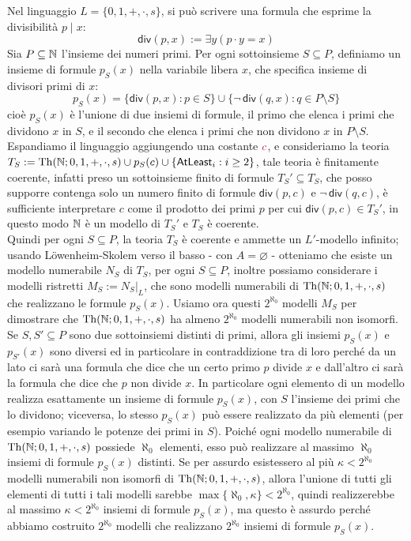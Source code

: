 \begin{soln}
    Nel linguaggio $L = \{0, 1, +, \cdot, s\}$, si può scrivere una formula che esprime la divisibilità $p \mid x$:
    \[ \mathsf{div}(p, x) := \exists y (p \cdot y = x) \]
    Sia $P \subseteq \mathbb N$ l'insieme dei numeri primi. Per ogni sottoinsieme $S \subseteq P$, definiamo un insieme di formule $p_S(x)$ nella variabile libera $x$, che specifica insieme di divisori primi di $x$:
    \[ p_S(x) = \{ \mathsf{div}(p, x) : p \in S \} \cup \{ \neg\, \mathsf{div}(q, x) : q \in P \setminus S \} \]
    cioè $p_S(x)$ è l'unione di due insiemi di formule, il primo che elenca i primi che dividono $x$ in $S$, e il secondo che elenca i primi che non dividono $x$ in $P \setminus S$.\\
    Espandiamo il linguaggio aggiungendo una costante $\textcolor{purple}{c}$, e consideriamo la teoria $T_S := \mathrm{Th}(\mathbb N; 0, 1, +, \cdot, s) \cup p_S(c) \cup \{\textsf{AtLeast}_i : i \geq 2\}$, tale teoria è finitamente coerente,
    infatti preso un sottoinsieme finito di formule $T_S' \subseteq T_S$, che posso supporre contenga solo un numero finito di formule $\mathsf{div}(p, c)$ e $\neg\, \mathsf{div}(q, c)$, è sufficiente interpretare $c$ come il prodotto dei primi $p$ per cui $\mathsf{div}(p, c) \in T_S'$,
    in questo modo $\mathbb N$ è un modello di $T_S'$ e $T_S$ è coerente.\\
    Quindi per ogni $S \subseteq P$, la teoria $T_S$ è coerente e ammette un $L'$-modello infinito; usando Löwenheim-Skolem verso il basso - con $A = \varnothing$ - otteniamo che esiste un modello numerabile $N_S$ di $T_S$, per ogni $S \subseteq P$,
    inoltre possiamo considerare i modelli ristretti $M_S := N_S|_L$, che sono modelli numerabili di $\mathrm{Th}(\mathbb N; 0, 1, +, \cdot, s)$ che realizzano le formule $p_S(x)$.
    Usiamo ora questi $2^{\aleph_0}$ modelli $M_S$ per dimostrare che $\mathrm{Th}(\mathbb N; 0, 1, +, \cdot, s)$ ha almeno $2^{\aleph_0}$ modelli numerabili non isomorfi.\\
    Se $S,S' \subseteq P$ sono due sottoinsiemi distinti di primi, allora gli insiemi $p_S(x)$ e $p_{S'}(x)$ sono diversi ed in particolare in contraddizione tra di loro perché da un lato ci sarà una formula che dice che un certo primo $p$ divide $x$ e dall'altro ci sarà la formula che dice che $p$ non divide $x$.
    In particolare ogni elemento di un modello realizza esattamente un insieme di formule $p_S(x)$, con $S$ l'insieme dei primi che lo dividono; viceversa, lo stesso $p_S(x)$ può essere realizzato da più elementi (per esempio variando le potenze dei primi in $S$). Poiché ogni modello numerabile di $\mathrm{Th}(\mathbb N; 0, 1, +, \cdot, s)$ possiede $\aleph_0$ elementi,
    esso può realizzare al massimo $\aleph_0$ insiemi di formule $p_S(x)$ distinti.
    Se per assurdo esistessero al più $\kappa < 2^{\aleph_0}$ modelli numerabili non isomorfi di $\mathrm{Th}(\mathbb N; 0, 1, +, \cdot, s)$, allora l'unione di tutti gli elementi di tutti i tali modelli
    sarebbe $\max\{\aleph_0, \kappa\} < 2^{\aleph_0}$, quindi realizzerebbe al massimo $\kappa < 2^{\aleph_0}$ insiemi di formule $p_S(x)$, ma questo è assurdo perché abbiamo costruito $2^{\aleph_0}$ modelli che realizzano $2^{\aleph_0}$ insiemi di formule $p_S(x)$.
\end{soln}

